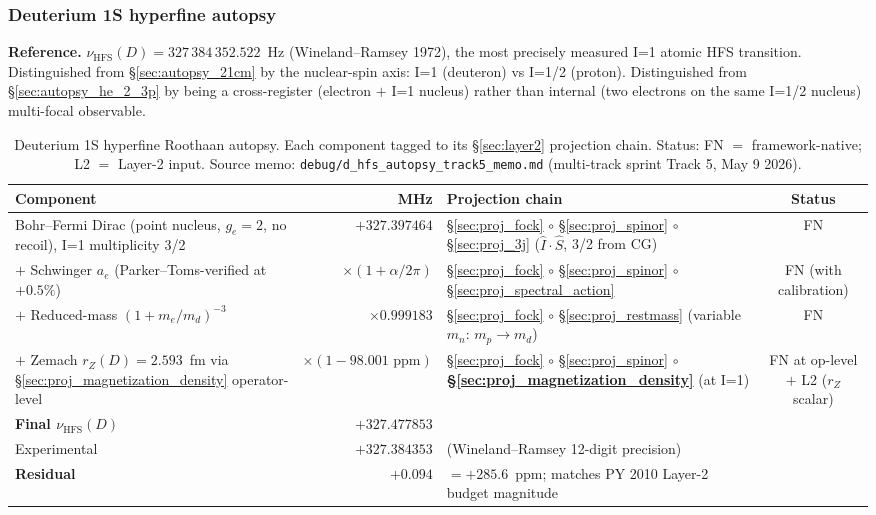 \documentclass[11pt]{article}
\begin{document}
\subsubsection{Deuterium 1S hyperfine autopsy}
\label{sec:autopsy_d_hfs}

\textbf{Reference.} $\nu_\text{HFS}(D) = 327\,384\,352.522$~Hz
(Wineland--Ramsey 1972), the most precisely measured I=1 atomic HFS
transition.  Distinguished from \S\ref{sec:autopsy_21cm} by the
nuclear-spin axis: I=1 (deuteron) vs I=1/2 (proton).  Distinguished
from \S\ref{sec:autopsy_he_2_3p} by being a cross-register
(electron $+$ I=1 nucleus) rather than internal (two electrons on
the same I=1/2 nucleus) multi-focal observable.

\begin{table}[h]
\centering\small
\begin{tabular}{p{4.5cm} r p{6cm} c}
\toprule
Component & MHz & Projection chain & Status \\
\midrule
Bohr--Fermi Dirac (point nucleus, $g_e=2$, no recoil), I=1
multiplicity 3/2 & $+327.397464$ &
\S\ref{sec:proj_fock} $\circ$ \S\ref{sec:proj_spinor} $\circ$
\S\ref{sec:proj_3j} ($\hat{I}\cdot\hat{S}$, 3/2 from CG) & FN \\
$+$ Schwinger $a_e$ (Parker--Toms-verified at $+0.5\%$) &
$\times (1+\alpha/2\pi)$ &
\S\ref{sec:proj_fock} $\circ$ \S\ref{sec:proj_spinor} $\circ$
\S\ref{sec:proj_spectral_action} & FN (with calibration) \\
$+$ Reduced-mass $(1+m_e/m_d)^{-3}$ & $\times 0.999183$ &
\S\ref{sec:proj_fock} $\circ$ \S\ref{sec:proj_restmass} (variable
$m_n$: $m_p \to m_d$) & FN \\
$+$ Zemach $r_Z(D)=2.593$~fm via \S\ref{sec:proj_magnetization_density}
operator-level & $\times (1 - 98.001 \text{~ppm})$ &
\S\ref{sec:proj_fock} $\circ$ \S\ref{sec:proj_spinor} $\circ$
\textbf{\S\ref{sec:proj_magnetization_density}} (at I=1) & FN at op-level
$+$ L2 ($r_Z$ scalar) \\
\midrule
\textbf{Final $\nu_\text{HFS}(D)$} & $+327.477853$ & & \\
Experimental & $+327.384353$ & (Wineland--Ramsey 12-digit precision) & \\
\textbf{Residual} & $+0.094$ & $= +285.6$~ppm; matches PY 2010 Layer-2
budget magnitude & \\
\bottomrule
\end{tabular}
\caption{Deuterium 1S hyperfine Roothaan autopsy.  Each component
tagged to its \S\ref{sec:layer2} projection chain. Status: FN $=$
framework-native; L2 $=$ Layer-2 input.  Source memo:
\texttt{debug/d\_hfs\_autopsy\_track5\_memo.md} (multi-track sprint
Track 5, May 9 2026).}
\label{tab:autopsy_d_hfs}
\end{table}
\end{document}
